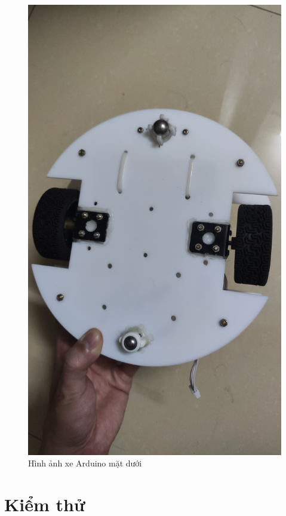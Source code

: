 \documentclass[../DoAn.tex]{subfiles}
\begin{document}
\begin{figure}[H]
    \centering
    \includegraphics[scale = 0.15]{Hinhve/car_3.jpg}
    \caption{Hình ảnh xe Arduino mặt dưới}
    \label{fig:Fig15}
\end{figure}

\section{Kiểm thử}
\end{document}
